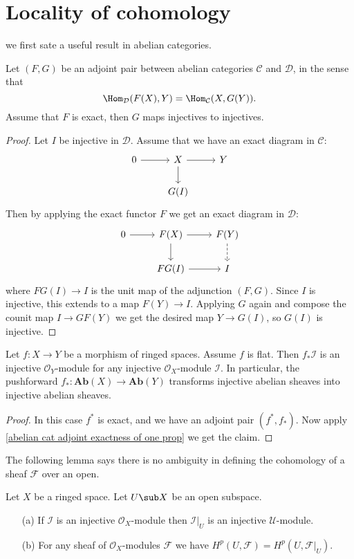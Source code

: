 \section{Locality of cohomology}
we first sate a useful result in abelian categories.
\begin{theorem}\label{abelian cat adjoint exactness of one prop}
Let $(F,G)$ be an adjoint pair between abelian categories $\mathcal{C}$ and $\mathcal{D}$, in the sense that
\[\Hom_{\mathcal{D}}(F(X),Y)=\Hom_{\mathcal{C}}(X,G(Y)).\]
Assume that $F$ is exact, then $G$ maps injectives to injectives.
\end{theorem}
\begin{proof}
Let $I$ be injective in $\mathcal{D}$. Assume that we have an exact diagram in $\mathcal{C}$:
\[\begin{tikzcd}
0\ar[r]&X\ar[r]\ar[d]&Y\\
&G(I)
\end{tikzcd}\]
Then by applying the exact functor $F$ we get an exact diagram in $\mathcal{D}$:
\[\begin{tikzcd}
0\ar[r]&F(X)\ar[r]\ar[d]&F(Y)\ar[d,dashed]\\
&FG(I)\ar[r]&I
\end{tikzcd}\]
where $FG(I)\to I$ is the unit map of the adjunction $(F,G)$. Since $I$ is injective, this extends to a map $F(Y)\to I$. Applying $G$ again and compose the counit map $I\to GF(Y)$ we get the desired map $Y\to G(I)$, so $G(I)$ is injective.
\end{proof}
\begin{proposition}
Let $f:X\to Y$ be a morphism of ringed spaces. Assume $f$ is flat. Then $f_*\mathscr{I}$ is an injective $\mathscr{O}_Y$-module for any injective $\mathscr{O}_X$-module $\mathscr{I}$. In particular, the pushforward $f_*:\mathbf{Ab}(X)\to\mathbf{Ab}(Y)$ transforms injective abelian sheaves into injective abelian sheaves.
\end{proposition}
\begin{proof}
In this case $f^*$ is exact, and we have an adjoint pair $(f^*,f_*)$. Now apply \cref{abelian cat adjoint exactness of one prop} we get the claim.
\end{proof}
The following lemma says there is no ambiguity in defining the cohomology of a sheaf $\mathscr{F}$ over an open.
\begin{lemma}
Let $X$ be a ringed space. Let $U\sub X$ be an open subspace.
\begin{itemize}
\item[(a)] If $\mathscr{I}$ is an injective $\mathscr{O}_X$-module then $\mathscr{I}|_U$ is an injective $\mathcal{U}$-module.
\item[(b)] For any sheaf of $\mathscr{O}_X$-modules $\mathscr{F}$ we have $H^p(U,\mathscr{F})=H^p(U,\mathscr{F}|_U)$.
\end{itemize}
\end{lemma}
